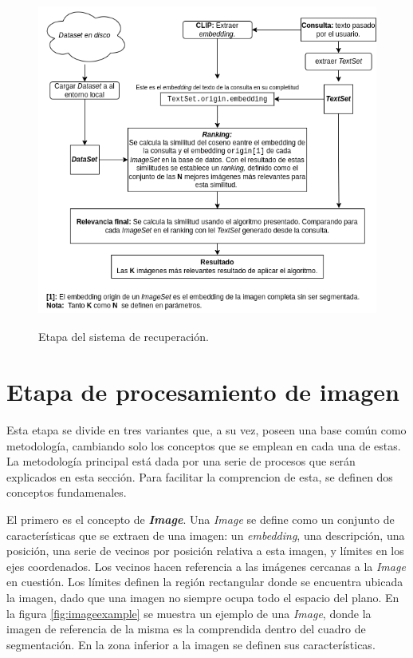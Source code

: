 \begin{figure}[H]
\centering
\includegraphics[height=110mm]{Graphics/SystemRetrieval.drawio.png}
\caption{Etapa del sistema de recuperaci\'on.}
\label{fig:etapa3}
\end{figure}


\section{Etapa de procesamiento de imagen}
Esta etapa se divide en tres variantes que, a su vez, poseen una base común como metodología, cambiando solo los conceptos que se emplean en cada una de estas. La metodología principal está dada por una serie de procesos que serán explicados en esta sección. Para facilitar la comprencion de esta, se definen dos conceptos fundamenales.

El primero es el concepto de \textbf{\textit{Image}}. Una \textit{Image} se define como un conjunto de características que se extraen de una imagen: un \textit{embedding}, una descripción, una posición, una serie de vecinos por posición relativa a esta imagen, y límites en los ejes coordenados. Los vecinos hacen referencia a las imágenes cercanas a la \textit{Image} en cuestión. Los límites definen la región rectangular donde se encuentra ubicada la imagen, dado que una imagen no siempre ocupa todo el espacio del plano. En la figura \ref{fig:imageexample} se muestra un ejemplo de una \textit{Image}, donde la imagen de referencia de la misma es la comprendida dentro del cuadro de segmentaci\'on. En la zona inferior a la imagen se definen sus caracter\'isticas.

